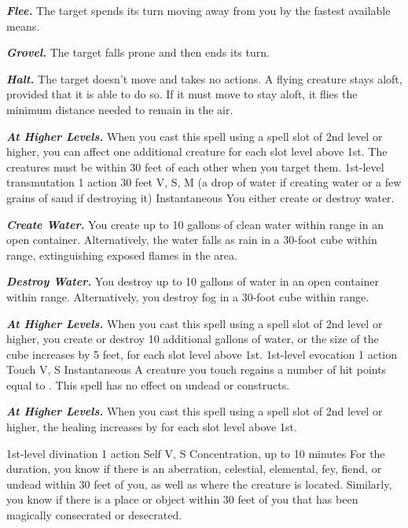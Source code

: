 \documentclass[10pt,twoside,twocolumn,openany]{book}
\newcommand{\castingModifier}{3}
\newcommand\impact[1]{
	\textbf{\textit{#1}}
}
\begin{document}
\impact{Flee.} The target spends its turn moving away from you by the fastest available means.

\impact{Grovel.} The target falls prone and then ends its turn.

\impact{Halt.} The target doesn't move and takes no actions. A flying creature stays aloft, provided that it is able to do so. If it must move to stay aloft, it flies the minimum distance needed to remain in the air.

\impact{At Higher Levels.} When you cast this spell using a spell slot of 2nd level or higher, you can affect one additional creature for each slot level above 1st. The creatures must be within 30 feet of each other when you target them.
\newpage
{}
{1st-level transmutation}
{\color{action} 1 action}
{30 feet}
{V, S, M (a drop of water if creating water or a few grains of sand if destroying it)}
{Instantaneous}
%
You either create or destroy water.

\impact{Create Water.} You create up to 10 gallons of clean
water within range in an open container. Alternatively, the water falls as rain in a 30-foot cube within range, extinguishing exposed flames in the area.

\impact{Destroy Water.} You destroy up to 10 gallons of water in an open container within range. Alternatively, you destroy fog in a 30-foot cube within range.

\impact{At Higher Levels.} When you cast this spell using a spell slot of 2nd level or higher, you create or destroy 10 additional gallons of water, or the size of the cube increases by 5 feet, for each slot level above 1st.
\newpage
{}
{1st-level evocation}
{\color{action} 1 action}
{Touch}
{V, S}
{Instantaneous}
%
A creature you touch regains a number of hit points equal to \dice{1d8 + \castingModifier}. This spell has no effect on undead or constructs.

\impact{At Higher Levels.} When you cast this spell using a spell slot of 2nd level or higher, the healing increases by
 for each slot level above 1st.

{1st-level divination}
{\color{action} 1 action}
{Self}
{V, S}
{{\color{concentration}Concentration}, up to 10 minutes}
%
For the duration, you know if there is an aberration, celestial, elemental, fey, fiend, or undead within 30 feet of you, as well as where the creature is located. Similarly, you know if there is a place or object within 30 feet of you that has been magically consecrated or desecrated.
\end{document}
